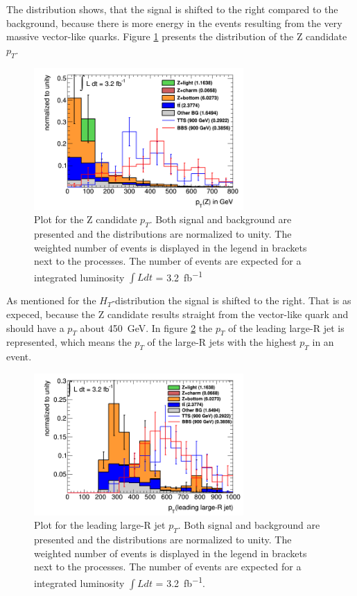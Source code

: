 The distribution shows, that the signal is shifted to the right compared to the background, because there is more energy in the events resulting from the very massive vector-like quarks. 
Figure \ref{Zpt} presents the distribution of the Z candidate $p_{T}$.
\begin{figure}
\centering
\includegraphics[width=8cm]{figures/Zpt.png}
\caption{Plot for the Z candidate $p_{T}$. 
Both signal and background are presented and the distributions are normalized to unity. 
The weighted number of events is displayed in the legend in brackets next to the processes. 
The number of events are expected for a integrated luminosity $\int L dt$ = \SI{3.2}{fb^{-1}}}
\label{Zpt}
\end{figure}

As mentioned for the $H_{T}$-distribution the signal is shifted to the right. That is as expeced, because the Z candidate results straight from the vector-like quark and should have a $p_{T}$ about \SI{450}{GeV}.
In figure \ref{leadingljet} the $p_{T}$ of the leading large-R jet is represented, which means the $p_{T}$ of the large-R jets with the highest $p_{T}$ in an event.
\vspace{-0.5cm}
\begin{figure}[h!]
\centering
\includegraphics[width=8cm]{figures/leadingljet.png}
\caption{Plot for the leading large-R jet $p_{T}$. 
Both signal and background are presented and the distributions are normalized to unity. 
The weighted number of events is displayed in the legend in brackets next to the processes. 
The number of events are expected for a integrated luminosity $\int L dt$ = \SI{3.2}{fb^{-1}}.}
\label{leadingljet}
\end{figure}

